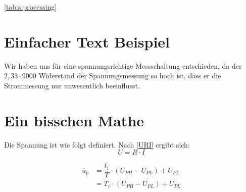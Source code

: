 		


	
	
	
	
	
% 



\tableofcontents
\newpage

\autoref{tab:s:processing}
\section{Einfacher Text Beispiel}
Wir haben uns für eine spannungsrichtige Messschaltung entschieden, da der $ 2,33 \cdot 9000 $ Widerstand der Spannungsmessung so hoch ist, dass er die Strommessung nur unwesentlich beeinflusst.

\section{Ein bisschen Mathe}
Die Spannung ist wie folgt definiert. Nach \autoref{URI} ergibt sich:
\begin{equation}
	U = R \cdot I \label{URI}
\end{equation}


\begin{align}
	\overline{u}_p & = \dfrac{t_{i}}{T} \cdot (U_{PH}-U_{PL}) + U_{PL} \\
	& = T_{v} \cdot (U_{PH}-U_{PL}) + U_{PL}
\end{align}

